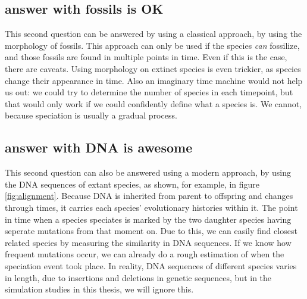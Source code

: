 {%
\subsection{answer with fossils is OK}

This second question can be answered by
using a classical approach, 
by using the morphology of fossils.
This approach can only be used if the species \emph{can} fossilize,
and those fossils are found in multiple points in time.
Even if this is the case, there are caveats. Using morphology on
extinct species is even trickier, as species change their appearance in time.
Also an imaginary time machine would not help us out:
we could try to determine the number of species in each timepoint,
but that would only work if we could confidently define what a
species is. We cannot, because speciation is usually a gradual process.

\subsection{answer with DNA is awesome}

This second question can also be answered 
using a modern approach, 
by using the DNA sequences of extant species,
as shown, for example, in figure \ref{fig:alignment}.
Because DNA is inherited from parent to offspring
and changes through times, it carries each species' 
evolutionary histories within it.
The point in time when a species speciates is
marked by the two daughter species having seperate mutations
from that moment on.
Due to this, we can easily find closest related species 
by measuring the similarity in DNA sequences.
If we know how frequent mutations occur, we can already
do a rough estimation of when the speciation event took place.
In reality, DNA sequences of different species 
varies in length, due to insertions and deletions in genetic sequences,
but in the simulation studies in this thesis, we will ignore this.

}
